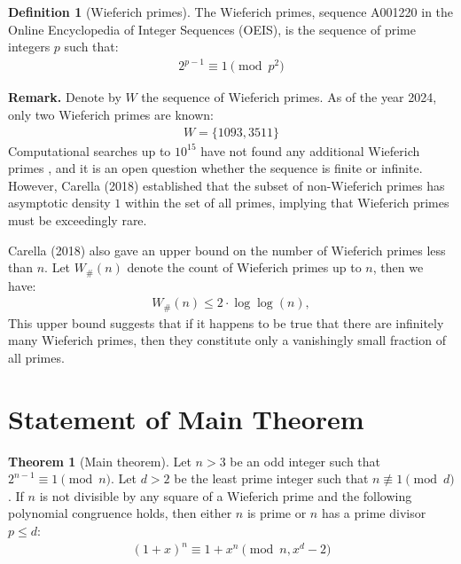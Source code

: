 \documentclass{article}
\theoremstyle{plain}
\theoremstyle{definition}
\newtheorem{definition}{Definition}
\newtheorem{theorem}{Theorem}
\begin{document}
\begin{definition}[Wieferich primes] \label{definition:wieferichprimes}
The Wieferich primes, sequence A001220 \cite{oeiswieferichprimes} in the Online Encyclopedia of Integer Sequences (OEIS), is the sequence of prime integers $p$ such that:
\begin{align}
    2^{p-1} \equiv 1 \pmod{p^2}
\end{align}

\textbf{Remark.}
Denote by $W$ the sequence of Wieferich primes. As of the year 2024, only two Wieferich primes are known:
\begin{align}
    W = \{ 1093, 3511 \}
\end{align}
Computational searches up to $10^{15}$ have not found any additional Wieferich primes \cite{carella2018results}, and it is an open question whether the sequence is finite or infinite. However, Carella (2018) \cite{carella2018results} established that the subset of non-Wieferich primes has asymptotic density $1$ within the set of all primes, implying that Wieferich primes must be exceedingly rare.

Carella (2018) \cite{carella2018results} also gave an upper bound on the number of Wieferich primes less than $n$. Let $W_{\#}(n)$ denote the count of Wieferich primes up to $n$, then we have:
\begin{align}
    W_{\#}(n) \leq 2 \cdot \log \log (n),
\end{align}
This upper bound suggests that if it happens to be true that there are infinitely many Wieferich primes, then they constitute only a vanishingly small fraction of all primes.
\end{definition}

\section{Statement of Main Theorem}
\begin{theorem}[Main theorem] \label{theorem:main}
Let $n > 3$ be an odd integer such that $2^{n-1} \equiv 1 \pmod{n}$. Let $d > 2$ be the least prime integer such that $n \not\equiv 1 \pmod{d}$. If $n$ is not divisible by any square of a Wieferich prime and the following polynomial congruence holds, then either $n$ is prime or $n$ has a prime divisor $p \leq d$:
\begin{align}
(1 + x)^n \equiv 1 + x^n \pmod{n, x^d - 2}
\end{align}
\end{theorem}
\end{document}
